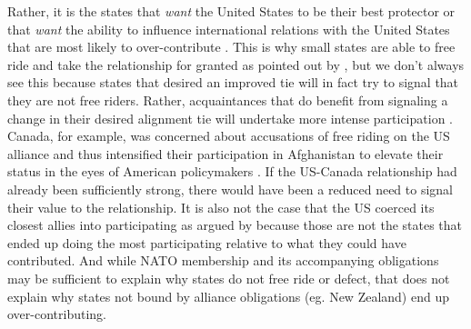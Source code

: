 \documentclass[12pt,letterpaper]{article}
\begin{document}
	Rather, it is the states that \textit{want} the United States to be their best protector or that \textit{want} the ability to influence international relations with the United States that are most likely to over-contribute \citep{vonhlatky_greatasymmetryamerica_2010}. This is why small states are able to free ride and take the relationship for granted as pointed out by \citet{keohane_biginfluencesmall_1971}, but we don't always see this because states that desired an improved tie will in fact try to signal that they are not free riders. Rather, acquaintances that do benefit from signaling a change in their desired alignment tie will undertake more intense participation \citep{gibler_priorcommitmentscompatible_2004, gartzke_contractsfriendsalliances_2012}. Canada, for example, was concerned about accusations of free riding on the US alliance and thus intensified their participation in Afghanistan to elevate their status in the eyes of American policymakers \citep{massie_alliancevaluestatus_2018}. If the US-Canada relationship had already been sufficiently strong, there would have been a reduced need to signal their value to the relationship. It is also not the case that the US coerced its closest allies into participating as argued by \citet{kupchan_natopersiangulf_1988} because those are not the states that ended up doing the most participating relative to what they could have contributed. And while NATO membership and its accompanying obligations may be sufficient to explain why states do not free ride or defect, that does not explain why states not bound by alliance obligations (eg. New Zealand) end up over-contributing.
\end{document}
